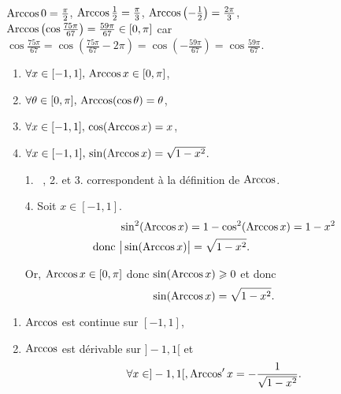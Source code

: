 \begin{exm}
	$\operatorname{Arccos} 0 = \frac{\pi}{2}$, $\operatorname{Arccos} \frac{1}{2} = \frac{\pi}{3}$, $\operatorname{Arccos} \left( -\frac{1}{2} \right) = \frac{2\pi}{3}$,\\
	$\operatorname{Arccos}\left( \cos \frac{75\pi}{67} \right) = \frac{59\pi}{67} \in [0, \pi]$ car $\cos\frac{75\pi}{67} = \cos\left(\frac{75\pi}{67} - 2\pi\right) = \cos\left( -\frac{59\pi}{67} \right) = \cos \frac{59\pi}{67}$.
\end{exm}

\begin{prop}
	\begin{enumerate}
		\item $\forall x \in [-1, 1],\,\operatorname{Arccos} x \in [0,\pi]$,
		\item $\forall \theta \in [0,\pi],\,\operatorname{Arccos}(\cos\theta) = \theta$,
		\item $\forall x \in [-1, 1],\,\cos(\operatorname{Arccos} x) = x$,
		\item $\forall x \in [-1, 1],\, \sin(\operatorname{Arccos} x) = \sqrt{1-x^2}$.
	\end{enumerate}
\end{prop}

\begin{prv}
	\begin{enumerate}
		\item[1.]~\kern-2.5mm, 2. et 3. correspondent à la définition de $\operatorname{Arccos}$.
		\item[4.] Soit $x \in [-1, 1]$.
			\begin{align*}
				&\sin^2(\operatorname{Arccos} x) = 1-\cos^2(\operatorname{Arccos} x) = 1-x^2\\
				\text{donc }& \big|\sin(\operatorname{Arccos} x)\big| = \sqrt{1-x^2}.
			\end{align*}

			Or, $\operatorname{Arccos} x \in [0,\pi]$ donc $\sin(\operatorname{Arccos} x) \geqslant 0$ et donc \[
				\sin(\operatorname{Arccos} x) = \sqrt{1-x^2}.
			\] 
	\end{enumerate}
\end{prv}

\begin{prop}
	\begin{enumerate}
		\item $\operatorname{Arccos}$ est continue sur $[-1,1]$,
		\item $\operatorname{Arccos}$ est dérivable sur $]-1,1[$ et \[
				\forall x \in ]-1, 1[, \operatorname{Arccos}' x = - \frac{1}{\sqrt{1-x^2}}.
			\]
	\end{enumerate}
\end{prop}

